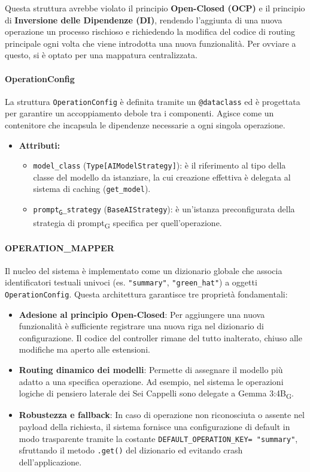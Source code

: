 \documentclass[11pt,a4paper]{article}
\newcommand{\gls}[1]{#1\textsubscript{G}}
\begin{document}
Questa struttura avrebbe violato il principio \textbf{Open-Closed (OCP)} e il principio di \textbf{Inversione delle Dipendenze (DI)}, rendendo l'aggiunta di una nuova operazione un processo rischioso e richiedendo la modifica del codice di routing principale ogni volta che viene introdotta una nuova funzionalità. Per ovviare a questo, si è optato per una mappatura centralizzata.

\paragraph{OperationConfig} 
La struttura \texttt{OperationConfig} è definita tramite un \texttt{@dataclass} ed è progettata per garantire un accoppiamento debole tra i componenti. Agisce come un contenitore che incapsula le dipendenze necessarie a ogni singola operazione.
\begin{itemize}
    \item\textbf{Attributi:}
    \begin{itemize}
        \item \texttt{model\_class} (\texttt{Type[AIModelStrategy]}): è il riferimento al tipo della classe del modello da istanziare, la cui creazione effettiva è delegata al sistema di caching (\texttt{get\_model}).
        \item \texttt{\gls{prompt}\_strategy} (\texttt{BaseAIStrategy}): è un'istanza preconfigurata della strategia di \gls{prompt} specifica per quell'operazione.
    \end{itemize}
\end{itemize}

\paragraph{OPERATION\_MAPPER}
Il nucleo del sistema è implementato come un dizionario globale che associa identificatori testuali univoci (es. \texttt{"summary"}, \texttt{"green\_hat"}) a oggetti \texttt{OperationConfig}. Questa architettura garantisce tre proprietà fondamentali:
\begin{itemize}
    \item \textbf{Adesione al principio Open-Closed}: Per aggiungere una nuova funzionalità è sufficiente registrare una nuova riga nel dizionario di configurazione. Il codice del controller rimane del tutto inalterato, chiuso alle modifiche ma aperto alle estensioni.
    \item \textbf{Routing dinamico dei modelli}: Permette di assegnare il modello più adatto a una specifica operazione. Ad esempio, nel sistema le operazioni logiche di pensiero laterale dei Sei Cappelli sono delegate a \gls{Gemma 3:4B}.
    \item \textbf{Robustezza e fallback}: In caso di operazione non riconosciuta o assente nel payload della richiesta, il sistema fornisce una configurazione di default in modo trasparente tramite la costante \texttt{DEFAULT\_OPERATION\_KEY= "summary"}, sfruttando il metodo \texttt{.get()} del dizionario ed evitando crash dell'applicazione.
\end{itemize}
\end{document}
